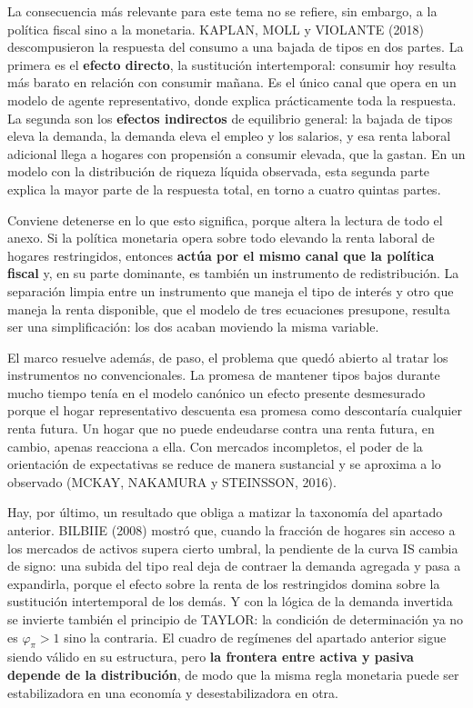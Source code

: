 \documentclass[10pt,a4paper]{article}
\newcounter{anexo}
\begin{document}
La consecuencia más relevante para este tema no se refiere, sin embargo, a la política fiscal sino a la monetaria. KAPLAN, MOLL y VIOLANTE (2018) descompusieron la respuesta del consumo a una bajada de tipos en dos partes. La primera es el \textbf{efecto directo}, la sustitución intertemporal: consumir hoy resulta más barato en relación con consumir mañana. Es el único canal que opera en un modelo de agente representativo, donde explica prácticamente toda la respuesta. La segunda son los \textbf{efectos indirectos} de equilibrio general: la bajada de tipos eleva la demanda, la demanda eleva el empleo y los salarios, y esa renta laboral adicional llega a hogares con propensión a consumir elevada, que la gastan. En un modelo con la distribución de riqueza líquida observada, esta segunda parte explica la mayor parte de la respuesta total, en torno a cuatro quintas partes.

Conviene detenerse en lo que esto significa, porque altera la lectura de todo el anexo. Si la política monetaria opera sobre todo elevando la renta laboral de hogares restringidos, entonces \textbf{actúa por el mismo canal que la política fiscal} y, en su parte dominante, es también un instrumento de redistribución. La separación limpia entre un instrumento que maneja el tipo de interés y otro que maneja la renta disponible, que el modelo de tres ecuaciones presupone, resulta ser una simplificación: los dos acaban moviendo la misma variable.

El marco resuelve además, de paso, el problema que quedó abierto al tratar los instrumentos no convencionales. La promesa de mantener tipos bajos durante mucho tiempo tenía en el modelo canónico un efecto presente desmesurado porque el hogar representativo descuenta esa promesa como descontaría cualquier renta futura. Un hogar que no puede endeudarse contra una renta futura, en cambio, apenas reacciona a ella. Con mercados incompletos, el poder de la orientación de expectativas se reduce de manera sustancial y se aproxima a lo observado (MCKAY, NAKAMURA y STEINSSON, 2016).

Hay, por último, un resultado que obliga a matizar la taxonomía del apartado anterior. BILBIIE (2008) mostró que, cuando la fracción de hogares sin acceso a los mercados de activos supera cierto umbral, la pendiente de la curva IS cambia de signo: una subida del tipo real deja de contraer la demanda agregada y pasa a expandirla, porque el efecto sobre la renta de los restringidos domina sobre la sustitución intertemporal de los demás. Y con la lógica de la demanda invertida se invierte también el principio de TAYLOR: la condición de determinación ya no es $\varphi_{\pi}>1$ sino la contraria. El cuadro de regímenes del apartado anterior sigue siendo válido en su estructura, pero \textbf{la frontera entre activa y pasiva depende de la distribución}, de modo que la misma regla monetaria puede ser estabilizadora en una economía y desestabilizadora en otra.
\end{document}
